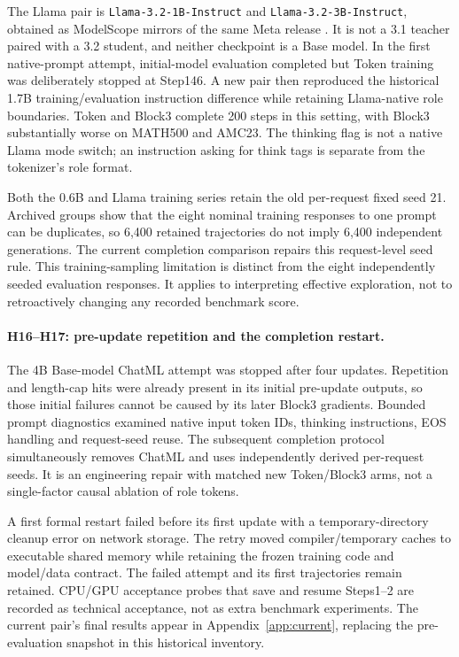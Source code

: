 The Llama pair is \texttt{Llama-3.2-1B-Instruct} and \texttt{Llama-3.2-3B-Instruct}, obtained as ModelScope mirrors of the same Meta release \citep{llama32}. It is not a 3.1 teacher paired with a 3.2 student, and neither checkpoint is a Base model. In the first native-prompt attempt, initial-model evaluation completed but Token training was deliberately stopped at Step146. A new pair then reproduced the historical 1.7B training/evaluation instruction difference while retaining Llama-native role boundaries. Token and Block3 complete 200 steps in this setting, with Block3 substantially worse on MATH500 and AMC23. The thinking flag is not a native Llama mode switch; an instruction asking for think tags is separate from the tokenizer's role format.

Both the 0.6B and Llama training series retain the old per-request fixed seed 21. Archived groups show that the eight nominal training responses to one prompt can be duplicates, so 6,400 retained trajectories do not imply 6,400 independent generations. The current completion comparison repairs this request-level seed rule. This training-sampling limitation is distinct from the eight independently seeded evaluation responses. It applies to interpreting effective exploration, not to retroactively changing any recorded benchmark score.

\paragraph{H16--H17: pre-update repetition and the completion restart.}
The 4B Base-model ChatML attempt was stopped after four updates. Repetition and length-cap hits were already present in its initial pre-update outputs, so those initial failures cannot be caused by its later Block3 gradients. Bounded prompt diagnostics examined native input token IDs, thinking instructions, EOS handling and request-seed reuse. The subsequent completion protocol simultaneously removes ChatML and uses independently derived per-request seeds. It is an engineering repair with matched new Token/Block3 arms, not a single-factor causal ablation of role tokens.

A first formal restart failed before its first update with a temporary-directory cleanup error on network storage. The retry moved compiler/temporary caches to executable shared memory while retaining the frozen training code and model/data contract. The failed attempt and its first trajectories remain retained. CPU/GPU acceptance probes that save and resume Steps1--2 are recorded as technical acceptance, not as extra benchmark experiments. The current pair's final results appear in Appendix~\ref{app:current}, replacing the pre-evaluation snapshot in this historical inventory.

